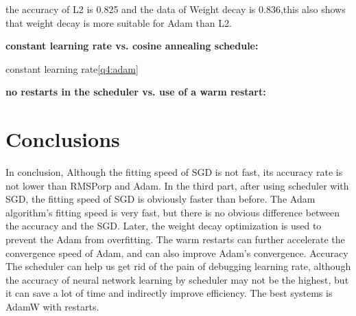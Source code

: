 \documentclass{article}
\begin{document}
\begin{figure}[H]\label{q4:adam}
	\centering  %
	\label{Fig.main}
\end{figure}

the accuracy of L2 is 0.825 and the data of Weight decay is 0.836,this also shows that weight decay is more suitable for Adam than L2.

\textbf{constant learning rate vs. cosine annealing schedule:}

constant learning rate\ref{q4:adam}


\textbf{no restarts in the scheduler vs. use of a warm restart:}




\section{Conclusions}
\label{sec:concl}

In conclusion, Although the fitting speed of SGD is not fast, its accuracy rate is not lower than RMSPorp and Adam. In the third part, after using scheduler with SGD, the fitting speed of SGD is obviously faster than before.
The Adam algorithm's fitting speed is very fast, but there is no obvious difference between the accuracy and the SGD. Later, the weight decay optimization is used to prevent the Adam from overfitting. The warm restarts can further accelerate the convergence speed of Adam, and can also improve Adam's convergence. Accuracy
The scheduler can help us get rid of the pain of debugging learning rate, although the accuracy of neural network learning by scheduler may not be the highest, but it can save a lot of time and indirectly improve efficiency.
The best systems is AdamW with restarts.



\end{document}
